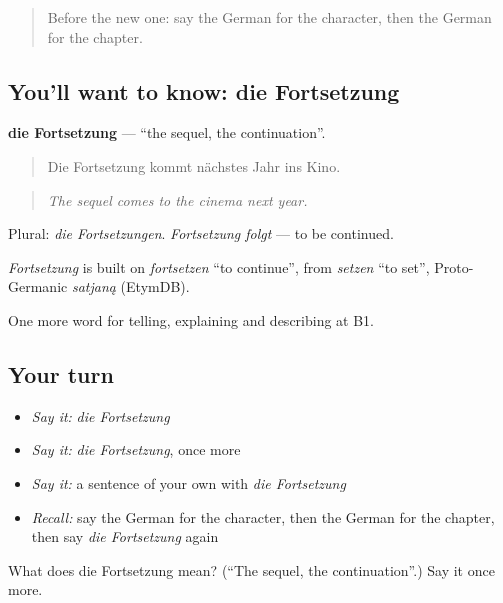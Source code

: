 \label{lesson:GE-C316-fortsetzung}



\begin{quote}
Before the new one: say the German for the character, then the German for the chapter.
\end{quote}

\subsection*{You'll want to know: die Fortsetzung}
\textbf{die Fortsetzung} — \textquotedblleft{}the sequel, the continuation\textquotedblright{}.

\begin{quote}
Die Fortsetzung kommt nächstes Jahr ins Kino.
\end{quote}

\begin{quote}
\emph{The sequel comes to the cinema next year.}
\end{quote}

Plural: \emph{die Fortsetzungen}. \emph{Fortsetzung folgt} — to be continued.

\begin{cousinweb}
\emph{Fortsetzung} is built on \emph{fortsetzen} \textquotedblleft{}to continue\textquotedblright{}, from \emph{setzen} \textquotedblleft{}to set\textquotedblright{}, Proto-Germanic \emph{satjaną} (EtymDB).
\end{cousinweb}

\begin{grammarlens}[title={What you've built}]
One more word for telling, explaining and describing at B1.
\end{grammarlens}

\subsection*{Your turn}
\begin{itemize}
\raggedright
  \item \emph{Say it:} \emph{die Fortsetzung}
  \item \emph{Say it:} \emph{die Fortsetzung}, once more
  \item \emph{Say it:} a sentence of your own with \emph{die Fortsetzung}
  \item \emph{Recall:} say the German for the character, then the German for the chapter, then say \emph{die Fortsetzung} again
\end{itemize}

\begin{tcolorbox}[breakable,colback=teal!4,colframe=teal!35!black,title={Before you move on}]
What does die Fortsetzung mean? (\textquotedblleft{}The sequel, the continuation\textquotedblright{}.) Say it once more.
\end{tcolorbox}
